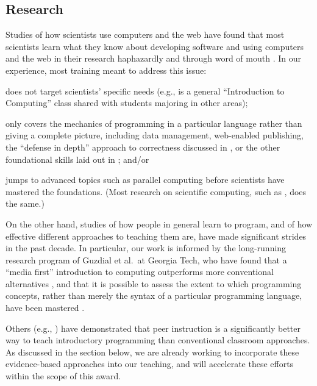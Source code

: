 \documentclass{proposalnsf}
\begin{document}
\subsection{Research}

Studies of how scientists use computers and the web have found that
most scientists learn what they know about developing software and
using computers and the web in their research haphazardly and through
word of mouth \cite{hannay2009,prabhu2011}. In our experience, most
training meant to address this issue:

\begin{compactitem}

\item
  does not target scientists' specific needs (e.g., is a general
  ``Introduction to Computing'' class shared with students majoring in
  other areas);

\item
  only covers the mechanics of programming in a particular language
  rather than giving a complete picture, including data management,
  web-enabled publishing, the ``defense in depth'' approach to
  correctness discussed in \cite{dubois2005}, or the other
  foundational skills laid out in \cite{wilson2013}; and/or

\item
  jumps to advanced topics such as parallel computing before
  scientists have mastered the foundations.  (Most research on
  scientific computing, such as \cite{hochstein2005}, does the same.)

\end{compactitem}

On the other hand, studies of how people in general learn to program,
and of how effective different approaches to teaching them are, have
made significant strides in the past decade.  In particular, our work
is informed by the long-running research program of Guzdial et al.\ at
Georgia Tech, who have found that a ``media first'' introduction to
computing outperforms more conventional alternatives
\cite{guzdial2013}, and that it is possible to assess the extent to
which programming concepts, rather than merely the syntax of a
particular programming language, have been mastered \cite{tew2011}.

Others (e.g., \cite{porter2013}) have demonstrated that peer
instruction is a significantly better way to teach introductory
programming than conventional classroom approaches.  As discussed in
the section below, we are already working to incorporate these
evidence-based approaches into our teaching, and will accelerate these
efforts within the scope of this award.
\end{document}
